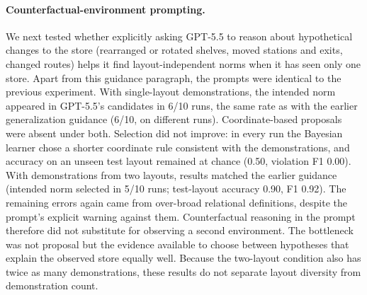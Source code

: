 \paragraph{Counterfactual-environment prompting.} We next tested whether explicitly asking GPT-5.5 to reason about
hypothetical changes to the store (rearranged or rotated shelves, moved stations and exits, changed routes) helps it
find layout-independent norms when it has seen only one store. Apart from this guidance paragraph, the prompts were
identical to the previous experiment. With single-layout demonstrations, the intended norm appeared in GPT-5.5's
candidates in 6/10 runs, the same rate as with the earlier generalization guidance (6/10, on different runs).
Coordinate-based proposals were absent under both. Selection did not improve: in every run the Bayesian learner chose
a shorter coordinate rule consistent with the demonstrations, and accuracy on an unseen test layout remained at chance
(0.50, violation F1 0.00). With demonstrations from two layouts, results matched the earlier guidance (intended norm
selected in 5/10 runs; test-layout accuracy 0.90, F1 0.92). The remaining errors again came from over-broad relational
definitions, despite the prompt's explicit warning against them. Counterfactual reasoning in the prompt therefore did
not substitute for observing a second environment. The bottleneck was not proposal but the evidence available to
choose between hypotheses that explain the observed store equally well. Because the two-layout condition also has
twice as many demonstrations, these results do not separate layout diversity from demonstration count.
